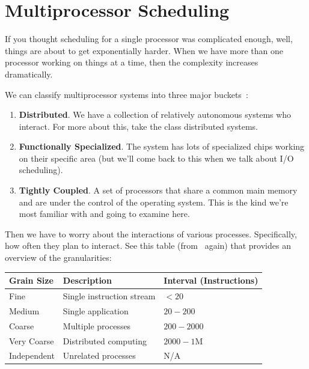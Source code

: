




\section*{Multiprocessor Scheduling}
If you thought scheduling for a single processor was complicated enough, well, things are about to get exponentially harder. When we have more than one processor working on things at a time, then the complexity increases dramatically. 

We can classify multiprocessor systems into three major buckets~\cite{osi}:

\begin{enumerate}
	\item \textbf{Distributed}. We have a collection of relatively autonomous systems who interact. For more about this, take the class distributed systems.
	\item \textbf{Functionally Specialized}. The system has lots of specialized chips working on their specific area (but we'll come back to this when we talk about I/O scheduling).
	\item \textbf{Tightly Coupled}. A set of processors that share a common main memory and are under the control of the operating system. This is the kind we're most familiar with and going to examine here.
\end{enumerate}

Then we have to worry about the interactions of various processes. Specifically, how often they plan to interact. See this table (from~\cite{osi} again) that provides an overview of the granularities:

\begin{center}
\begin{tabular}{l|l|l}
	\textbf{Grain Size} & \textbf{Description} & \textbf{Interval (Instructions)}\\ \hline
	Fine & Single instruction stream & $< 20$ \\\hline
	Medium & Single application & $20 - 200$ \\\hline
	Coarse & Multiple processes & $200 - 2000$ \\\hline
	Very Coarse & Distributed computing & $2000 - 1$M \\\hline
	Independent & Unrelated processes & N/A \\

\end{tabular}
\end{center}

